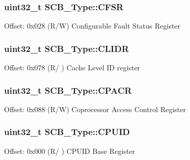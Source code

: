 \subsubsection[{\texorpdfstring{C\+F\+SR}{CFSR}}]{ uint32\+\_\+t S\+C\+B\+\_\+\+Type\+::\+C\+F\+SR}\hypertarget{struct_s_c_b___type_a2f94bf549b16fdeb172352e22309e3c4}{}\label{struct_s_c_b___type_a2f94bf549b16fdeb172352e22309e3c4}
Offset\+: 0x028 (R/W) Configurable Fault Status Register 
\subsubsection[{\texorpdfstring{C\+L\+I\+DR}{CLIDR}}]{ uint32\+\_\+t S\+C\+B\+\_\+\+Type\+::\+C\+L\+I\+DR}\hypertarget{struct_s_c_b___type_a82963b2e0c2350e66778c4a8cfb9a2ef}{}\label{struct_s_c_b___type_a82963b2e0c2350e66778c4a8cfb9a2ef}
Offset\+: 0x078 (R/ ) Cache Level ID register 
\subsubsection[{\texorpdfstring{C\+P\+A\+CR}{CPACR}}]{ uint32\+\_\+t S\+C\+B\+\_\+\+Type\+::\+C\+P\+A\+CR}\hypertarget{struct_s_c_b___type_af460b56ce524a8e3534173f0aee78e85}{}\label{struct_s_c_b___type_af460b56ce524a8e3534173f0aee78e85}
Offset\+: 0x088 (R/W) Coprocessor Access Control Register 
\subsubsection[{\texorpdfstring{C\+P\+U\+ID}{CPUID}}]{ uint32\+\_\+t S\+C\+B\+\_\+\+Type\+::\+C\+P\+U\+ID}\hypertarget{struct_s_c_b___type_afa7a9ee34dfa1da0b60b4525da285032}{}\label{struct_s_c_b___type_afa7a9ee34dfa1da0b60b4525da285032}
Offset\+: 0x000 (R/ ) C\+P\+U\+ID Base Register 
